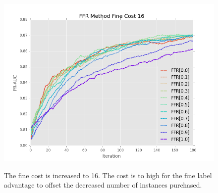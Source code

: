 \documentclass[ms]{nuthesis}
\begin{document}
\FloatBarrier
\begin{figure}[!htb]
	\centering
    \includegraphics[width=1.0\columnwidth]{fig/ParamsFFR_PR_Cost16_rnds0_180}
    \label{fig:ParamsFFR_PR_Cost16_rnds0_180}
    \caption{The fine cost is increased to 16. The cost is to high for the fine label advantage to offset
    the decreased number of instances purchased.}
\end{figure}
\FloatBarrier

%


%
%


%
\end{document}
